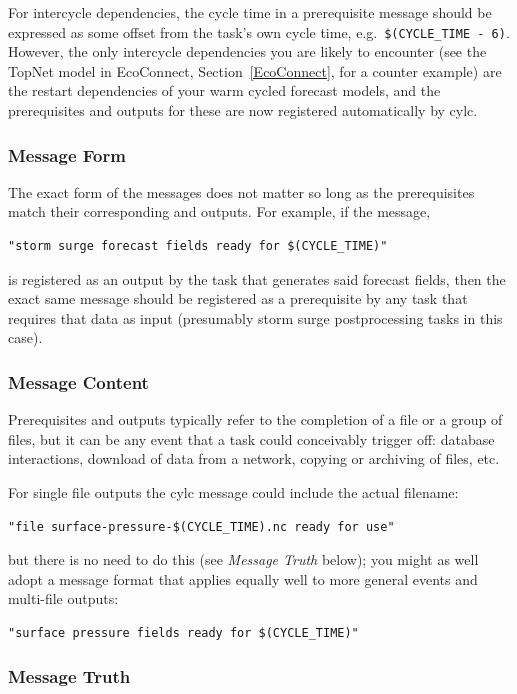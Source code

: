 \documentclass[11pt,a4paper]{article}
\begin{document}
For intercycle dependencies, the cycle time in a prerequisite message
should be expressed as some offset from the task's own cycle time, e.g.\
\lstinline=$(CYCLE_TIME - 6)=. However, the only intercycle dependencies
you are likely to encounter (see the TopNet model in EcoConnect,
Section~\ref{EcoConnect}, for a counter example) are the restart
dependencies of your warm cycled forecast models, and the prerequisites
and outputs for these are now registered automatically by cylc.

\subsubsection{Message Form}

The exact form of the messages does not matter so long as the
prerequisites match their corresponding and outputs. For example, if
the message, 
\begin{lstlisting}
"storm surge forecast fields ready for $(CYCLE_TIME)"
\end{lstlisting} 
is registered as an output by the task that generates said forecast
fields, then the exact same message should be registered as a
prerequisite by any task that requires that data as input
(presumably storm surge postprocessing tasks in this case). 

\subsubsection{Message Content}

Prerequisites and outputs typically refer to the completion of a file or
a group of files, but it can be any event that a task could conceivably
trigger off: database interactions, download of data from a network,
copying or archiving of files, etc.

For single file outputs the cylc message could include the actual
filename:
\begin{lstlisting}
"file surface-pressure-$(CYCLE_TIME).nc ready for use"
\end{lstlisting}
but there is no need to do this (see {\em Message Truth} below); you
might as well adopt a message format that applies equally well to
more general events and multi-file outputs:
\begin{lstlisting}
"surface pressure fields ready for $(CYCLE_TIME)"
\end{lstlisting}


\subsubsection{Message Truth}
\end{document}

